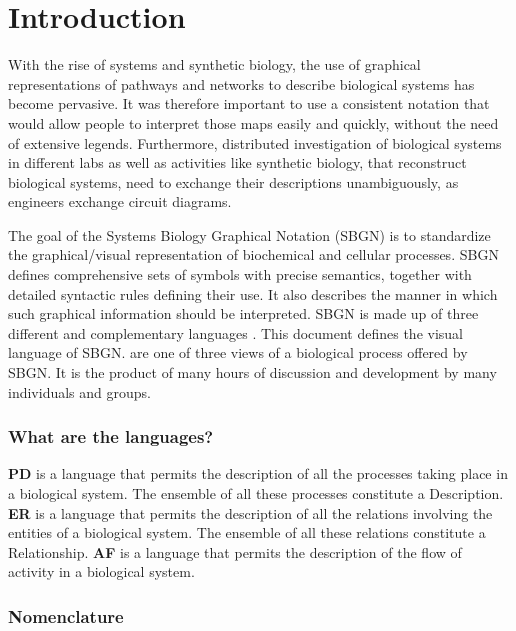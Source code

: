 
\chapter{Introduction}
\label{sec:intro}

With the rise of systems and synthetic biology, the use of graphical
representations of pathways and networks to describe biological
systems has become pervasive. It was therefore important to use a
consistent notation that would allow people to interpret those maps
easily and quickly, without the need of extensive
legends. Furthermore, distributed investigation of biological systems
in different labs as well as activities like synthetic biology, that
reconstruct biological systems, need to exchange their descriptions
unambiguously, as engineers exchange circuit diagrams.

The goal of the Systems Biology Graphical Notation (SBGN) is to
standardize the graphical/visual representation of biochemical and
cellular processes. SBGN defines comprehensive sets of symbols with
precise semantics, together with detailed syntactic rules defining
their use. It also describes the manner in which such graphical
information should be interpreted. SBGN is made up of three different
and complementary languages \cite{LeNovere:NatBiotechnol:2009}. This document
defines the \emph{\AF} visual language of SBGN. \AFs are one of three
views of a biological process offered by SBGN.  It is the product of
many hours of discussion and development by many individuals and
groups.
 
\subsection{What are the languages?}

\textbf{PD} is a language that permits the description of all the processes taking place in a biological system. The ensemble of all these processes constitute a Description. \textbf{ER} is a language that permits the description of all the relations involving the entities of a biological system. The ensemble of all these relations constitute a Relationship.\textbf{ AF} is a language that permits the description of the flow of activity in a biological system.

\subsection{Nomenclature}

